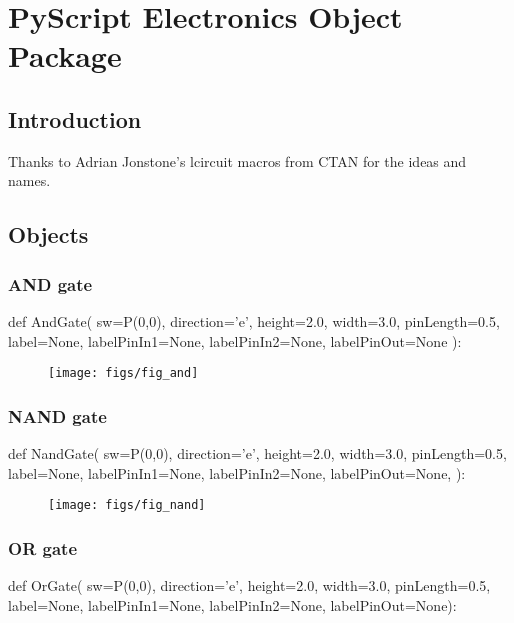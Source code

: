 \chapter{PyScript Electronics Object Package}

\section{Introduction}

Thanks to Adrian Jonstone's lcircuit macros from CTAN for the ideas
and names.

\section{Objects}

\subsection{AND gate}
\label{func:electronicsAnd}
\begin{python}
def AndGate(
    sw=P(0,0),
    direction='e',
    height=2.0,
    width=3.0,
    pinLength=0.5,
    label=None,
    labelPinIn1=None,
    labelPinIn2=None,
    labelPinOut=None
    ):
\end{python}

\begin{figure}[!h]
\centerline{\texttt{[image: figs/fig\_and]}}
\end{figure}

\subsection{NAND gate}
\label{func:electronicsNand}
\begin{python}
def NandGate(
        sw=P(0,0),
        direction='e',
        height=2.0,
        width=3.0,
        pinLength=0.5,
        label=None,
        labelPinIn1=None,
        labelPinIn2=None,
        labelPinOut=None,
        ):
\end{python}

\begin{figure}[!h]
\centerline{\texttt{[image: figs/fig\_nand]}}
\end{figure}

\subsection{OR gate}
\label{func:electronicsOr}
\begin{python}
def OrGate(
        sw=P(0,0),
        direction='e',
        height=2.0,
        width=3.0,
        pinLength=0.5,
        label=None,
        labelPinIn1=None,
        labelPinIn2=None,
        labelPinOut=None):
\end{python}

